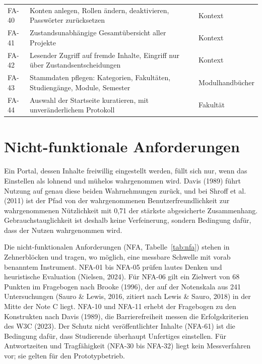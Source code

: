 \begin{longtable}{@{}L{1.2cm}L{9.6cm}L{3.7cm}@{}}
	FA-40 & Konten anlegen, Rollen ändern, deaktivieren, Passwörter zurücksetzen & Kontext \\
	FA-41 & Zustandsunabhängige Gesamtübersicht aller Projekte & Kontext \\
	FA-42 & Lesender Zugriff auf fremde Inhalte, Eingriff nur über Zustandsentscheidungen & Kontext \\
	FA-43 & Stammdaten pflegen: Kategorien, Fakultäten, Studiengänge, Module, Semester & Modulhandbücher \\
	FA-44 & Auswahl der Startseite kuratieren, mit unveränderlichem Protokoll & Fakultät \\
\end{longtable}
\endgroup

\section{Nicht-funktionale Anforderungen}
\label{sec:nichtfunktionale-anforderungen}

Ein Portal, dessen Inhalte freiwillig eingestellt werden, füllt sich nur, wenn das Einstellen als lohnend und mühelos wahrgenommen wird. Davis (1989) führt Nutzung auf genau diese beiden Wahrnehmungen zurück, und bei Shroff et al. (2011) ist der Pfad von der wahrgenommenen Benutzerfreundlichkeit zur wahrgenommenen Nützlichkeit mit 0,71 der stärkste abgesicherte Zusammenhang. Gebrauchstauglichkeit ist deshalb keine Verfeinerung, sondern Bedingung dafür, dass der Nutzen wahrgenommen wird.

Die nicht-funktionalen Anforderungen (NFA, Tabelle~\ref{tab:nfa}) stehen in Zehnerblöcken und tragen, wo möglich, eine messbare Schwelle mit vorab benanntem Instrument. NFA-01 bis NFA-05 prüfen lautes Denken und heuristische Evaluation (Nielsen, 2024). Für NFA-06 gilt ein Zielwert von 68 Punkten im Fragebogen nach Brooke (1996), der auf der Notenskala aus 241 Untersuchungen (Sauro \& Lewis, 2016, zitiert nach Lewis \& Sauro, 2018) in der Mitte der Note C liegt. NFA-10 und NFA-11 erhebt der Fragebogen zu den Konstrukten nach Davis (1989), die Barrierefreiheit messen die Erfolgskriterien des W3C (2023). Der Schutz nicht veröffentlichter Inhalte (NFA-61) ist die Bedingung dafür, dass Studierende überhaupt Unfertiges einstellen. Für Antwortzeiten und Tragfähigkeit (NFA-30 bis NFA-32) liegt kein Messverfahren vor; sie gelten für den Prototypbetrieb.

